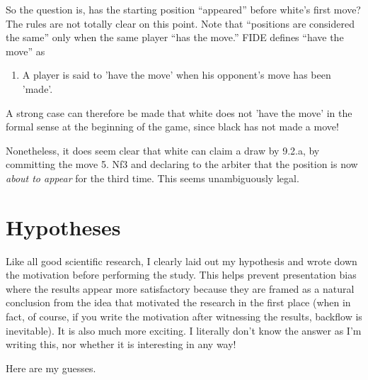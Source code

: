 \documentclass[twocolumn]{article}
\begin{document}
{  So the question is, has the starting position ``appeared'' before
  white's first move? The rules are not totally clear on this point.
  Note that ``positions are considered the same'' only when the
  same player ``has the move.'' FIDE defines ``have the move'' as
  \begin{enumerate}[label=\arabic*.3.] %
    \item A player is said to 'have the move' when his opponent's
    move has been 'made'.
  \end{enumerate}
  A strong case can therefore be made that white does not 'have the
  move' in the formal sense at the beginning of the game, since black
  has not made a move!
  
  Nonetheless, it does seem clear that white can claim a draw by
  9.2.a, by committing the move 5. Nf3 and declaring to the arbiter
  that the position is now {\it about to appear} for the third time.
  This seems unambiguously legal. }

\section{Hypotheses}

Like all good scientific research, I clearly laid out my hypothesis
and wrote down the motivation before performing the study. This helps
prevent presentation bias where the results appear more satisfactory
because they are framed as a natural conclusion from the idea that
motivated the research in the first place (when in fact, of course, if
you write the motivation after witnessing the results, backflow is
inevitable). It is also much more exciting. I literally don't know the
answer as I'm writing this, nor whether it is interesting in any way!


Here are my guesses.
\end{document}
